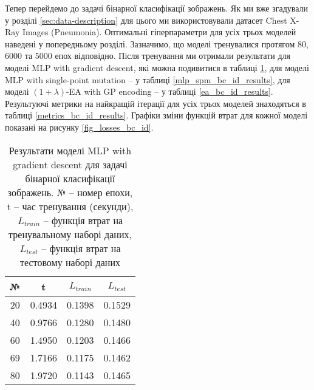 Тепер перейдемо до задачі бінарної класифікації зображень. Як ми вже згадували у розділі \ref{sec:data-description} для цього ми використовували датасет Chest X-Ray Images (Pneumonia). Оптимальні гіперпараметри для усіх трьох моделей наведені у попередньому розділі. Зазначимо, що моделі тренувалися протягом 80, 6000 та 5000 епох відповідно. Після тренування ми отримали результати для моделі MLP with gradient descent, які можна подивитися в таблиці \ref{mlp_gd_bc_id_results}, для моделі MLP with single-point mutation -- у таблиці \ref{mlp_spm_bc_id_results}, для моделі $(1+\lambda)$-EA with GP encoding -- у таблиці \ref{ea_bc_id_results}. Результуючі метрики на найкращій ітерації для усіх трьох моделей знаходяться в таблиці \ref{metrics_bc_id_results}. Графіки зміни функцій втрат для кожної моделі показані на рисунку \ref{fig_losses_bc_id}.

\begin{table}[ht]
	\centering
	\begin{adjustbox}{max width=\textwidth}
		\begin{tabular}{|c|c|c|c|}
			\hline 
			№ & t & $L_{train}$ & $L_{test}$ \\
			\hline 
			20 & 0.4934 & 0.1398 & 0.1529 \\
			\hline 
			40 & 0.9766 & 0.1280 & 0.1480 \\
			\hline
			60 & 1.4950 & 0.1203 & 0.1466 \\
			\hline
			69 & 1.7166 & 0.1175 & 0.1462 \\
			\hline
			80 & 1.9720 & 0.1143 & 0.1465 \\
			\hline
		\end{tabular}
	\end{adjustbox}
	\caption{Результати моделі MLP with gradient descent для задачі бінарної класифікації зображень. № -- номер епохи, t -- час тренування (секунди), $L_{train}$ -- функція втрат на тренувальному наборі даних, $L_{test}$ -- функція втрат на тестовому наборі даних}
	\label{mlp_gd_bc_id_results}
\end{table}

